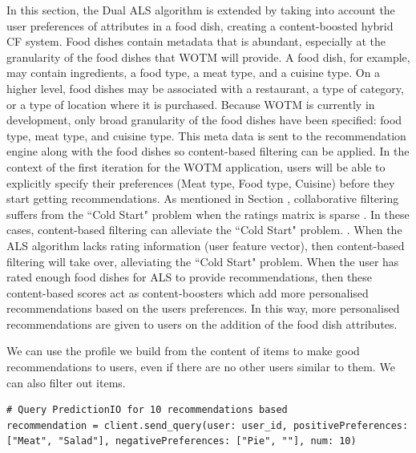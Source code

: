 In this section, the Dual ALS algorithm is extended by taking into account the user preferences of attributes in a food dish, creating a content-boosted hybrid CF system. Food dishes contain metadata that is abundant, especially at the granularity of the food dishes that WOTM will provide. A food dish, for example, may contain ingredients, a food type, a meat type, and a cuisine type. On a higher level, food dishes may be associated with a restaurant, a type of category, or a type of location where it is purchased. Because WOTM is currently in development, only broad granularity of the food dishes have been specified: food type, meat type, and cuisine type. This meta data is sent to the recommendation engine along with the food dishes so content-based filtering can be applied. In the context of the first iteration for the WOTM application, users will be able to explicitly specify their preferences (Meat type, Food type, Cuisine) before they start getting recommendations. As mentioned in Section , collaborative filtering suffers from the ``Cold Start" problem when the ratings matrix is sparse . In these cases, content-based filtering can alleviate the ``Cold Start" problem. . When the ALS algorithm lacks rating information (user feature vector), then content-based filtering will take over, alleviating the ``Cold Start" problem. When the user has rated enough food dishes for ALS to provide recommendations, then these content-based scores act as content-boosters which add more personalised recommendations based on the users preferences. In this way, more personalised recommendations are given to users on the addition of the food dish attributes.


We can use the profile we build from the content
of items to make good recommendations to
users, even if there are no other users similar to
them. We can also filter out items.

\begin{lstlisting} 
# Query PredictionIO for 10 recommendations based
recommendation = client.send_query(user: user_id, positivePreferences: ["Meat", "Salad"], negativePreferences: ["Pie", ""], num: 10)
\end{lstlisting}



